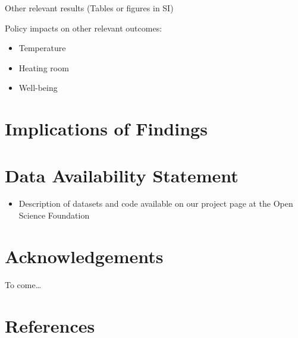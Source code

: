 \documentclass[
  letterpaper,
  DIV=11,
  numbers=noendperiod]{scrartcl}
\providecommand{\tightlist}{%
  \setlength{\itemsep}{0pt}\setlength{\parskip}{0pt}}\usepackage{longtable,booktabs,array}
\begin{document}
Other relevant results (Tables or figures in SI)

Policy impacts on other relevant outcomes:

\begin{itemize}
\tightlist
\item
  Temperature
\item
  Heating room
\item
  Well-being
\end{itemize}

\hypertarget{implications-of-findings}{%
\section{Implications of Findings}\label{implications-of-findings}}

\hypertarget{data-availability-statement}{%
\section{Data Availability
Statement}\label{data-availability-statement}}

\begin{itemize}
\tightlist
\item
  Description of datasets and code available on our project page at the
  Open Science Foundation
\end{itemize}

\hypertarget{acknowledgements}{%
\section{Acknowledgements}\label{acknowledgements}}

To come\ldots{}

\hypertarget{references}{%
\section{References}\label{references}}
\end{document}
